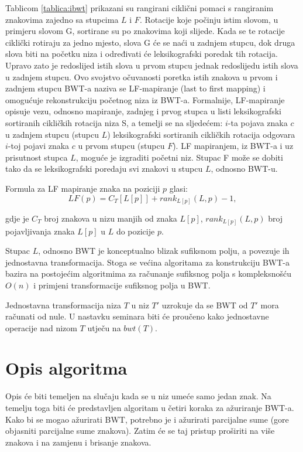 \documentclass{ferseminar}
\begin{document}
Tablicom \ref{tablica:ibwt} prikazani su rangirani ciklični pomaci s rangiranim znakovima zajedno sa stupcima $L$ i $F$. Rotacije koje počinju istim slovom, u primjeru slovom G, sortirane su po znakovima koji slijede. Kada se te rotacije ciklički rotiraju za jedno mjesto, slova G će se naći u zadnjem stupcu, dok druga slova biti na početku niza i određivati će leksikografski poredak tih rotacija. Upravo zato je redoslijed istih slova u prvom stupcu jednak redoslijedu istih slova u zadnjem stupcu. Ovo svojstvo očuvanosti poretka istih znakova u prvom i zadnjem stupcu BWT-a naziva se LF-mapiranje (last to first mapping) i omogućuje rekonstrukciju početnog niza iz BWT-a. Formalnije, LF-mapiranje opisuje vezu, odnosno mapiranje, zadnjeg i prvog stupca u listi leksikografski sortiranih cikličkih rotacija niza S, a temelji se na sljedećem: $i$-ta pojava znaka $c$ u zadnjem stupcu (stupcu $L$) leksikografski sortiranih cikličkih rotacija
odgovara $i$-toj pojavi znaka $c$ u prvom stupcu (stupcu $F$). LF mapiranjem, iz BWT-a i uz prisutnost stupca $L$, moguće je izgraditi početni niz. Stupac F može se dobiti tako da se leksikografski poredaju svi znakovi u stupcu $L$, odnosno BWT-u.

Formula za LF mapiranje znaka na poziciji $p$ glasi:
\begin{equation}
	LF(p)=C_T[L[p]]+rank_{L[p]}(L,p)-1 ,
\end{equation}

gdje je $C_T$ broj znakova u nizu manjih od znaka $L[p]$, $rank_{L[p]}(L,p)$ broj pojavljivanja znaka $L[p]$ u $L$ do pozicije $p$.

Stupac $L$, odnosno BWT je konceptualno blizak sufiksnom polju, a povezuje ih jednostavna transformacija. Stoga se većina algoritama za konstrukciju BWT-a bazira na postojećim algoritmima za računanje sufiksnog polja s kompleksnošću $O(n)$ i primjeni transformacije sufiksnog polja u BWT.

Jednostavna transformacija niza $T$ u niz $T'$ uzrokuje da se BWT od $T'$ mora računati od nule. U nastavku seminara biti će proučeno kako jednostavne operacije nad nizom $T$ utječu na $bwt(T)$. 

\section{Opis algoritma}
Opis će biti temeljen na slučaju kada se u niz umeće samo jedan znak. Na temelju toga biti će predstavljen algoritam u četiri koraka za ažuriranje BWT-a. Kako bi se mogao ažurirati BWT, potrebno je i ažurirati parcijalne sume (gore objasniti parcijalne sume znakova). Zatim će se taj pristup proširiti na više znakova i na zamjenu i brisanje znakova.
\end{document}
